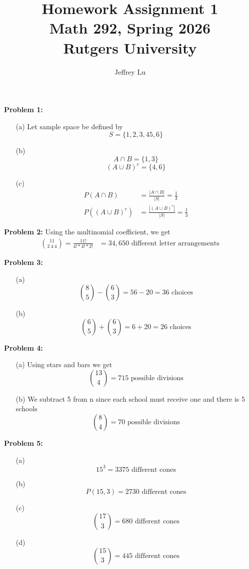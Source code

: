 \documentclass[12pt]{article}
\title{Homework Assignment 1 \\ \large Math 292, Spring 2026 \\ Rutgers University}
\author{Jeffrey Lu}
\begin{document}
\maketitle

\noindent \textbf{Problem 1:}
\begin{enumerate}
    \item[(a)]
          Let sample space be defined by
          \[
              S = \{1, 2, 3, 4 5, 6\}
          \]
    \item[(b)]
          \[
              A\cap{B} = \{1,3 \}
          \]
          \[
              (A\cup{B})^c = \{4,6\}
          \]
    \item[(c)]
          \begin{align*}
              P(A\cap{B})     & = \frac{|A\cap{B}|}{|S|} = \frac{1}{3}     \\
              P((A\cup{B})^c) & = \frac{|(A\cup{B})^c|}{|S|} = \frac{1}{3}
          \end{align*}
\end{enumerate}

\noindent \textbf{Problem 2:}
Using the multinomial coefficient, we get
\begin{align*}
    \binom{11}{2~4~4} = \frac{11!}{4!*4!*2!} & = 34,650 \text{ different letter arrangements}
\end{align*}

\noindent \textbf{Problem 3:}
\begin{enumerate}
    \item[(a)]
          \[
              \binom{8}{5} - \binom{6}{3} = 56 - 20 = 36 \text{ choices}
          \]
    \item[(b)]
          \[
              \binom{6}{5} + \binom{6}{3} = 6 + 20 = 26 \text{ choices}
          \]

\end{enumerate}

\noindent \textbf{Problem 4:}
\begin{enumerate}
    \item[(a)] Using stars and bars we get
          \[
              \binom{13}{4} = 715 \text{ possible divisions}
          \]

    \item[(b)] We subtract 5 from n since each school must receive one and there is 5 schools
          \[
              \binom{8}{4} = 70 \text{ possible divisions}
          \]
\end{enumerate}

\noindent \textbf{Problem 5:}
\begin{enumerate}
    \item[(a)]
          \[
              15^3 = 3375 \text{ different cones}
          \]
    \item[(b)]
          \[
              P(15,3) = 2730 \text{ different cones}
          \]
    \item[(c)]
          \[
              \binom{17}{3} = 680 \text{ different cones}
          \]
    \item[(d)]
          \[
              \binom{15}{3} = 445 \text{ different cones}
          \]
\end{enumerate}
\end{document}
